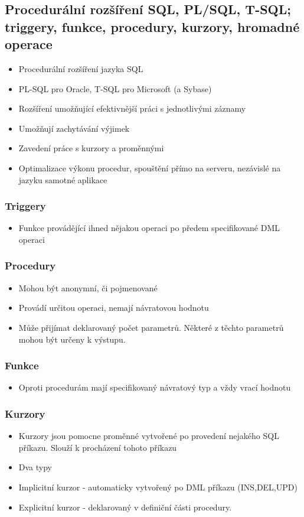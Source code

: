 \documentclass[10pt,a4paper]{article}
\begin{document}
\subsection{Procedurální rozšíření SQL, PL/SQL, T-SQL; triggery, funkce, procedury, kurzory, hromadné operace}
\begin{itemize}
\item Procedurální rozšíření jazyka SQL
\item PL-SQL pro Oracle, T-SQL pro Microsoft (a Sybase)
\item Rozšíření umožňující efektivnější práci s jednotlivými záznamy
\item Umožňují zachytávání výjimek
\item Zavedení práce s kurzory a proměnnými
\item Optimalizace výkonu procedur, spouštění přímo na serveru, nezávislé na jazyku samotné aplikace
\end{itemize}
\subsubsection{Triggery}
\begin{itemize}
\item Funkce provádějící ihned nějakou operaci po předem specifikované DML operaci
\end{itemize}
\subsubsection{Procedury}
\begin{itemize}
\item Mohou být anonymní, či pojmenované
\item Provádí určitou operaci, nemají návratovou hodnotu
\item Může přijímat deklarovaný počet parametrů. Některé z těchto parametrů mohou být určeny k výstupu.
\end{itemize}
\subsubsection{Funkce}
\begin{itemize}
\item Oproti procedurám mají specifikovaný návratový typ a vždy vrací hodnotu
\end{itemize}
\subsubsection{Kurzory}
\begin{itemize}
\item Kurzory jsou pomocne proměnné vytvořené po provedení nejakého SQL příkazu. Slouží k procházení tohoto příkazu
\item Dva typy
\item Implicitní kurzor - automaticky vytvořený po DML příkazu (INS,DEL,UPD)
\item Explicitní kurzor - deklarovaný v definiční části procedury.
\end{itemize}
\end{document}
